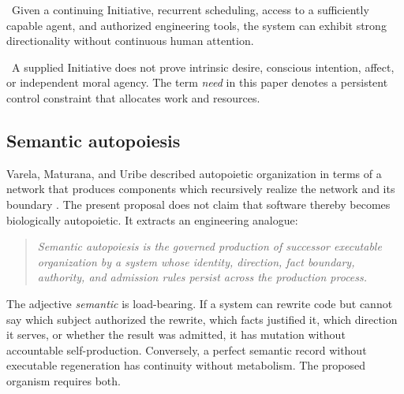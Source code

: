 \inferencelabel\ Given a continuing Initiative, recurrent scheduling, access
to a sufficiently capable agent, and authorized engineering tools, the system
can exhibit strong directionality without continuous human attention.

\nonclaimlabel\ A supplied Initiative does not prove intrinsic desire,
conscious intention, affect, or independent moral agency. The term
\emph{need} in this paper denotes a persistent control constraint that
allocates work and resources.

\subsection{Semantic autopoiesis}

Varela, Maturana, and Uribe described autopoietic organization in terms of a
network that produces components which recursively realize the network and
its boundary \cite{varela1974autopoiesis}. The present proposal does not claim
that software thereby becomes biologically autopoietic. It extracts an
engineering analogue:

\begin{quote}
\emph{Semantic autopoiesis is the governed production of successor executable
organization by a system whose identity, direction, fact boundary, authority,
and admission rules persist across the production process.}
\end{quote}

The adjective \emph{semantic} is load-bearing. If a system can rewrite code but
cannot say which subject authorized the rewrite, which facts justified it,
which direction it serves, or whether the result was admitted, it has
mutation without accountable self-production. Conversely, a perfect semantic
record without executable regeneration has continuity without metabolism.
The proposed organism requires both.
